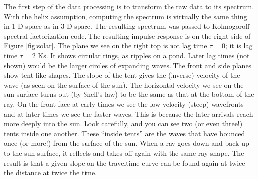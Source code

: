 \par
The first step of the data processing is
to transform the raw data to its spectrum.
With the helix assumption, computing the spectrum is
virtually the same thing in 1-D space as in 3-D space.
The resulting spectrum was passed to Kolmogoroff spectral factorization code.
The resulting impulse response is on the right side of 
Figure \ref{fig:solar}.
The plane we see on the right top is not lag time $\tau=0$;
it is lag time $\tau=2$ Ks.
It shows circular rings, as ripples on a pond.
Later lag times (not shown) would be the larger circles of expanding waves.
The front and side planes show tent-like shapes.
The slope of the tent gives the (inverse) velocity of the wave
(as seen on the surface of the sun).
The horizontal velocity we see on the sun surface turns out
(by Snell's law)
to be the same as that at the bottom of the ray.
On the front face at early times we see the low velocity (steep) wavefronts
and at later times we see the faster waves.
This is because the later arrivals reach more deeply into the sun.
Look carefully, and you can see two (or even three!) tents inside one another.
These ``inside tents'' are the waves that have bounced once (or more!)
from the surface of the sun.
When a ray goes down and back up to the sun surface,
it reflects and takes off again with the same ray shape.
The result is that a given slope on the traveltime curve
can be found again at twice the distance at twice the time.

